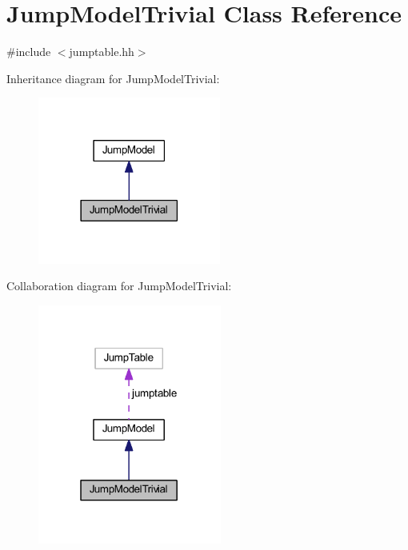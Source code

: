 \hypertarget{class_jump_model_trivial}{}\section{Jump\+Model\+Trivial Class Reference}
\label{class_jump_model_trivial}


{\ttfamily \#include $<$jumptable.\+hh$>$}



Inheritance diagram for Jump\+Model\+Trivial\+:
\nopagebreak
\begin{figure}[H]
\begin{center}
\leavevmode
\includegraphics[width=170pt]{class_jump_model_trivial__inherit__graph}
\end{center}
\end{figure}


Collaboration diagram for Jump\+Model\+Trivial\+:
\nopagebreak
\begin{figure}[H]
\begin{center}
\leavevmode
\includegraphics[width=171pt]{class_jump_model_trivial__coll__graph}
\end{center}
\end{figure}
